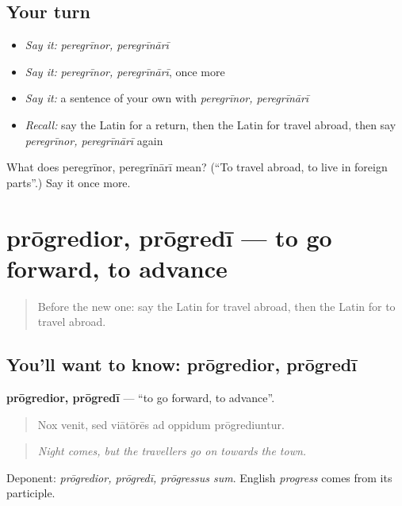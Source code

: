 \subsection*{Your turn}
\begin{itemize}
\raggedright
  \item \emph{Say it:} \emph{peregrīnor, peregrīnārī}
  \item \emph{Say it:} \emph{peregrīnor, peregrīnārī}, once more
  \item \emph{Say it:} a sentence of your own with \emph{peregrīnor, peregrīnārī}
  \item \emph{Recall:} say the Latin for a return, then the Latin for travel abroad, then say \emph{peregrīnor, peregrīnārī} again
\end{itemize}

\begin{tcolorbox}[breakable,colback=teal!4,colframe=teal!35!black,title={Before you move on}]
What does peregrīnor, peregrīnārī mean? (\textquotedblleft{}To travel abroad, to live in foreign parts\textquotedblright{}.) Say it once more.
\end{tcolorbox}
\section[prōgredior, prōgredī]{prōgredior, prōgredī — to go forward, to advance}

\label{lesson:LA-C428-progredior}



\begin{quote}
Before the new one: say the Latin for travel abroad, then the Latin for to travel abroad.
\end{quote}

\subsection*{You'll want to know: prōgredior, prōgredī}
\textbf{prōgredior, prōgredī} — \textquotedblleft{}to go forward, to advance\textquotedblright{}.

\begin{quote}
Nox venit, sed viātōrēs ad oppidum prōgrediuntur.
\end{quote}

\begin{quote}
\emph{Night comes, but the travellers go on towards the town.}
\end{quote}

Deponent: \emph{prōgredior, prōgredī, prōgressus sum}. English \emph{progress} comes from its participle.

